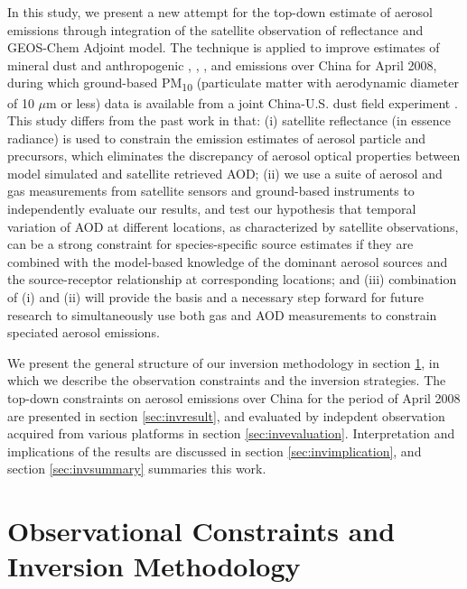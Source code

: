  In this study, we present a new attempt for the top-down estimate 
 of aerosol emissions through integration of the satellite observation 
 of reflectance and GEOS-Chem Adjoint model. 
 The technique is applied to improve estimates of mineral dust 
 and anthropogenic , , ,  and  
 emissions over China for April 2008, during which ground-based 
 PM\textsubscript{10} (particulate matter with aerodynamic diameter of 
 10 $\mu$m or less) data is available from a joint China-U.S. 
 dust field experiment \citep{Huang10}. 
 This study differs from the past work in that: 
 (i) satellite reflectance (in essence radiance) is used 
 to constrain the emission estimates of aerosol particle and precursors, 
 which eliminates the discrepancy of aerosol optical properties 
 between model simulated and satellite retrieved AOD; 
 (ii) we use a suite of aerosol and gas measurements 
 from satellite sensors and ground-based instruments 
 to independently evaluate our results, and test our hypothesis 
 that temporal variation of AOD at different locations, 
 as characterized by satellite observations, can be a strong constraint 
 for species-specific source estimates if they are combined with 
 the model-based knowledge of the dominant aerosol sources 
 and the source-receptor relationship at corresponding locations; 
 and (iii) combination of (i) and (ii) will provide the basis and 
 a necessary step forward for future research to simultaneously 
 use both gas and AOD measurements to constrain speciated aerosol emissions. 

 We present the general structure of our inversion methodology in
section \ref{sec:generalstr}, in which we describe the observation 
constraints and the inversion strategies. The top-down constraints on aerosol 
emissions over China for the period of April 2008 are presented in 
section \ref{sec:invresult},  and evaluated by indepdent observation acquired 
from various platforms in section \ref{sec:invevaluation}. Interpretation and
implications of the results are discussed in section \ref{sec:invimplication},
and section \ref{sec:invsummary} summaries this work.

\section{Observational Constraints and Inversion Methodology} 
\label{sec:generalstr}

